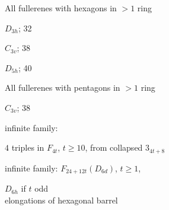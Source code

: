 \documentclass[%
pdf,
colorBG,
slideColor,
]{prosper}
\begin{document}
\begin{slide}{All fullerenes with hexagons in $>1$ ring}

\begin{center}
\begin{minipage}[b]{35mm}
\centering
{}\par
$D_{3h}$; 32
\end{minipage}
\begin{minipage}[b]{35mm}
\centering
{}\par
$C_{3v}$; 38
\end{minipage}
\begin{minipage}[b]{35mm}
\centering
{}\par
$D_{5h}$; 40
\end{minipage}
\end{center}

\end{slide}



\begin{slide}{All fullerenes with pentagons in $>1$ ring}

\begin{center}
\begin{minipage}{3.5cm}
\centering
{}\par
$C_{3v}$; 38
\end{minipage}
\begin{minipage}{3.5cm}
\centering
{}\par
infinite family:\par
$4$ triples 
in $F_{4t}$, $t\ge 10$,
from collapsed $3_{4t+8}$
\end{minipage}
\begin{minipage}{3.5cm}
\centering
{}\par
infinite family:
$F_{24+12t}(D_{6d})$, $t \geq 1$, \par
$D_{6h}$ if $t$ odd \\
elongations of hexagonal barrel
\end{minipage}
\end{center}

\end{slide}
\end{document}

